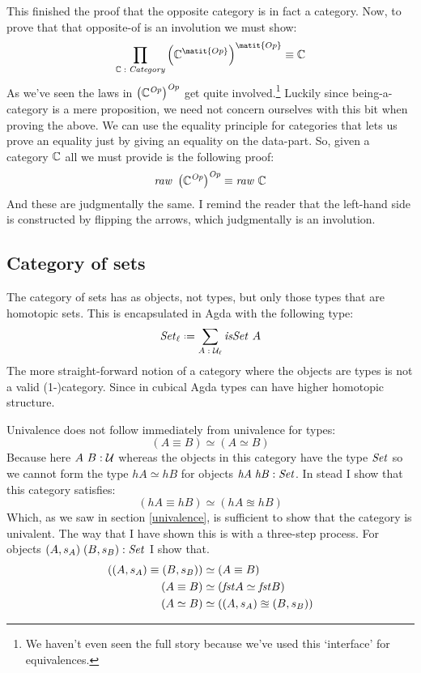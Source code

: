 This finished the proof that the opposite category is in fact a category. Now,
to prove that that opposite-of is an involution we must show:
%
$$
\prod_{\bC \tp \mathit{Category}} \left(\bC^{\matit{Op}}\right)^{\matit{Op}} \equiv \bC
$$
%
As we've seen the laws in $\left(\mathbb{C}^{\mathit{Op}}\right)^{\mathit{Op}}$ get
quite involved.\footnote{We haven't even seen the full story because we've used
  this `interface' for equivalences.} Luckily since being-a-category is a mere
proposition, we need not concern ourselves with this bit when proving the above.
We can use the equality principle for categories that lets us prove an equality
just by giving an equality on the data-part. So, given a category $\mathbb{C}$ all we
must provide is the following proof:
%
$$
\mathit{raw}\ \left(\bC^{\mathit{Op}}\right)^{\mathit{Op}} \equiv \mathit{raw}\ \bC
$$
%
And these are judgmentally the same. I remind the reader that the left-hand side
is constructed by flipping the arrows, which judgmentally is an involution.

\subsection{Category of sets}
The category of sets has as objects, not types, but only those types that are
homotopic sets. This is encapsulated in Agda with the following type:
%
$$\Set_\ell \defeq \sum_{A \tp \MCU_\ell} \isSet\ A$$
%
The more straight-forward notion of a category where the objects are types is
not a valid (1-)category. Since in cubical Agda types can have higher homotopic
structure.

Univalence does not follow immediately from univalence for types:
%
$$(A \equiv B) \simeq (A \simeq B)$$
%
Because here $A\ B \;\mathord{:}\; \mathcal{U}$ whereas the objects in this category have the type
$\mathit{Set}$ so we cannot form the type $\mathit{hA} \simeq \mathit{hB}$ for objects
$\mathit{hA}\;\mathit{hB} \;\mathord{:}\; \mathit{Set}$. In stead I show that this category
satisfies:
%
$$
(\mathit{hA} \equiv \mathit{hB}) \simeq (\mathit{hA} \approxeq \mathit{hB})
$$
%
Which, as we saw in section \ref{univalence}, is sufficient to show that the
category is univalent. The way that I have shown this is with a three-step
process. For objects $(A, s_A)\; (B, s_B) \;\mathord{:}\; \mathit{Set}$ I show that.
%
\begin{align*}
 ((A, s_A) \equiv (B, s_B)) & \simeq (A \equiv B) \\
 (A \equiv B) & \simeq (\mathit{fst} A \simeq \mathit{fst} B) \\
 (A \simeq B) & \simeq ((A, s_A) \approxeq (B, s_B))
\end{align*}

